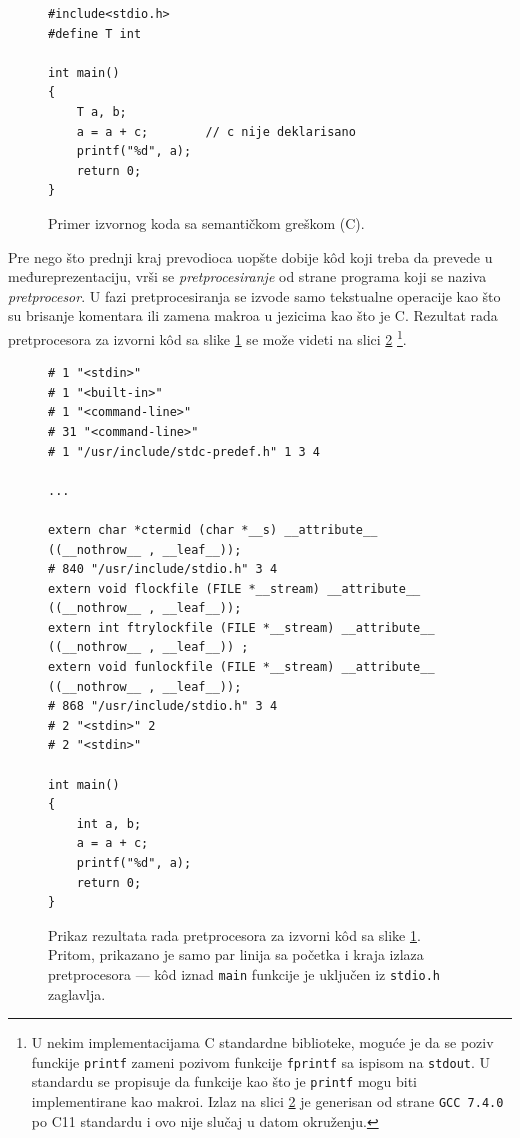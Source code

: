 \begin{figure}[h!]
\begin{lstlisting}
#include<stdio.h>
#define T int

int main()
{
    T a, b;
    a = a + c;        // c nije deklarisano
    printf("%d", a);
    return 0;
}
\end{lstlisting}
\caption{Primer izvornog koda sa semantičkom greškom (C).}
\label{fig:CompilationProcessInit}
\end{figure}

Pre nego što prednji kraj prevodioca uopšte dobije k\^od koji treba da prevede u međureprezentaciju, vrši se \emph{pretprocesiranje} od strane programa koji se naziva \emph{pretprocesor}. U fazi pretprocesiranja se izvode samo tekstualne operacije kao što su brisanje komentara ili zamena makroa u jezicima kao što je C. Rezultat rada pretprocesora za izvorni k\^od sa slike \ref{fig:CompilationProcessInit} se može videti na slici \ref{fig:CompilationProcessPrep} 
\footnote{U nekim implementacijama C standardne biblioteke, moguće je da se poziv funckije \texttt{printf} zameni pozivom funkcije \texttt{fprintf} sa ispisom na \texttt{stdout}. U standardu se propisuje da funkcije kao što je \texttt{printf} mogu biti implementirane kao makroi. Izlaz na slici \ref{fig:CompilationProcessPrep} je generisan od strane \texttt{GCC 7.4.0} po C11 standardu i ovo nije slučaj u datom okruženju.}.

\begin{figure}[h!]
\begin{lstlisting}
# 1 "<stdin>"
# 1 "<built-in>"
# 1 "<command-line>"
# 31 "<command-line>"
# 1 "/usr/include/stdc-predef.h" 1 3 4

...

extern char *ctermid (char *__s) __attribute__ ((__nothrow__ , __leaf__));
# 840 "/usr/include/stdio.h" 3 4
extern void flockfile (FILE *__stream) __attribute__ ((__nothrow__ , __leaf__));
extern int ftrylockfile (FILE *__stream) __attribute__ ((__nothrow__ , __leaf__)) ;
extern void funlockfile (FILE *__stream) __attribute__ ((__nothrow__ , __leaf__));
# 868 "/usr/include/stdio.h" 3 4
# 2 "<stdin>" 2
# 2 "<stdin>"

int main()
{
    int a, b;
    a = a + c;
    printf("%d", a);
    return 0;
}
\end{lstlisting}
\caption{Prikaz rezultata rada pretprocesora za izvorni k\^od sa slike \ref{fig:CompilationProcessInit}. Pritom, prikazano je samo par linija sa početka i kraja izlaza pretprocesora --- k\^od iznad \texttt{main} funkcije je uključen iz \texttt{stdio.h} zaglavlja.}
\label{fig:CompilationProcessPrep}
\end{figure}

